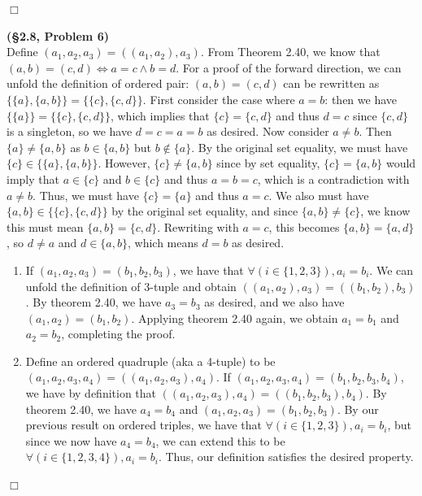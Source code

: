 \documentclass[12pt]{article}
\theoremstyle{definition}
\newenvironment{Solution}{\noindent {\sc Solution.}}{$\Box$ \vspace{2 ex}}
\begin{document}
\begin{Solution}
\end{Solution}

\vspace{0.5cm}

\begin{Solution}
{\bf (\S2.8, Problem 6)}\\
Define $(a_1,a_2,a_3)=((a_1,a_2),a_3)$. From Theorem 2.40, we know that $(a,b)=(c,d)\iff a=c\land b=d$. For a proof of the forward direction, we can unfold the definition of ordered pair: $(a,b)=(c,d)$ can be rewritten as $\{\{a\},\{a,b\}\}=\{\{c\},\{c,d\}\}$. First consider the case where $a=b$: then we have $\{\{a\}\}=\{\{c\},\{c,d\}\}$, which implies that $\{c\}=\{c,d\}$ and thus $d=c$ since $\{c,d\}$ is a singleton, so we have $d=c=a=b$ as desired. Now consider $a\ne b$. Then $\{a\}\ne\{a,b\}$ as $b\in \{a,b\}$ but $b\not\in\{a\}$. By the original set equality, we must have $\{c\}\in\{\{a\},\{a,b\}\}$. However, $\{c\}\ne\{a,b\}$ since by set equality, $\{c\}=\{a,b\}$ would imply that $a\in \{c\}$ and $b\in \{c\}$ and thus $a=b=c$, which is a contradiction with $a\ne b$. Thus, we must have $\{c\}=\{a\}$ and thus $a=c$. We also must have $\{a,b\}\in \{\{c\},\{c,d\}\}$ by the original set equality, and since $\{a,b\}\ne \{c\}$, we know this must mean $\{a,b\}=\{c,d\}$. Rewriting with $a=c$, this becomes $\{a,b\}=\{a,d\}$, so $d\ne a$ and $d\in \{a,b\}$, which means $d=b$ as desired.
\begin{enumerate}
    \item If $(a_1,a_2,a_3)=(b_1,b_2,b_3)$, we have that $\forall(i\in\{1,2,3\}), a_i=b_i$. We can unfold the definition of 3-tuple and obtain $((a_1,a_2),a_3)=((b_1,b_2),b_3)$. By theorem 2.40, we have $a_3 = b_3$ as desired, and we also have $(a_1,a_2)=(b_1,b_2)$. Applying theorem 2.40 again, we obtain $a_1 =b_1$ and $a_2 = b_2$, completing the proof.
    \item Define an ordered quadruple (aka a 4-tuple) to be $(a_1,a_2,a_3,a_4)=((a_1,a_2,a_3),a_4)$. If $(a_1,a_2,a_3,a_4)=(b_1,b_2,b_3,b_4)$, we have by definition that $((a_1,a_2,a_3),a_4)=((b_1,b_2,b_3),b_4)$. By theorem 2.40, we have $a_4=b_4$ and $(a_1,a_2,a_3)=(b_1,b_2,b_3)$. By our previous result on ordered triples, we have that $\forall(i\in\{1,2,3\}),a_i=b_i$, but since we now have $a_4=b_4$, we can extend this to be $\forall(i\in\{1,2,3,4\}),a_i=b_i$. Thus, our definition satisfies the desired property.
\end{enumerate}
\end{Solution}
\end{document}
